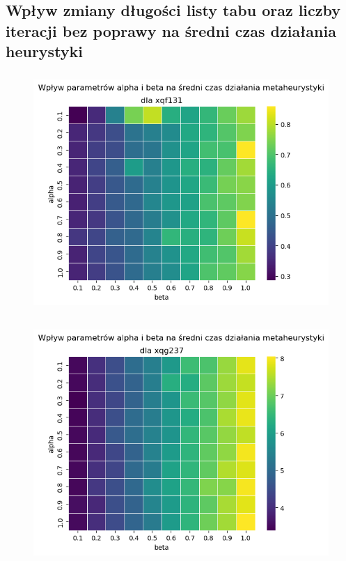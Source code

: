 \documentclass{article}
\begin{document}
\subsection{Wpływ zmiany długości listy tabu oraz liczby iteracji bez poprawy na średni czas działania heurystyki}
    \begin{figure}[h!]
        \centering
        \includegraphics[height=9cm]{../../plots/ts-tuning-alpha-beta-time-xqf131.png}
    \end{figure}
    
    \begin{figure}[h!]
        \centering
        \includegraphics[height=9cm]{../../plots/ts-tuning-alpha-beta-time-xqg237.png}
    \end{figure}

\newpage
\end{document}
